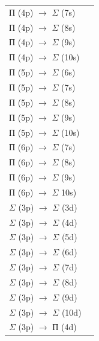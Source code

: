 \begin{flushleft}
\begin{supertabular}{|m{6.577cm}|m{6.801cm}|}
{П (4p) $\rightarrow $ $\Sigma $ (7s)} &
\raggedleft{}\\
{П (4p) $\rightarrow $ $\Sigma $ (8s)} &
\raggedleft{}\\
{П (4p) $\rightarrow $ $\Sigma $ (9s)} &
\raggedleft{}\\
{П (4p) $\rightarrow $ $\Sigma $ (10s)} &
\raggedleft{}\\\hline
{П (5p) $\rightarrow $ $\Sigma $ (6s)} &
\raggedleft{}\\
{П (5p) $\rightarrow $ $\Sigma $ (7s)} &
\raggedleft{}\\
{П (5p) $\rightarrow $ $\Sigma $ (8s)} &
\raggedleft{}\\
{П (5p) $\rightarrow $ $\Sigma $ (9s)} &
\raggedleft{}\\
{П (5p) $\rightarrow $ $\Sigma $ (10s)} &
\raggedleft{}\\\hline
{П (6p) $\rightarrow $ $\Sigma $ (7s)} &
\raggedleft{}\\
{П (6p) $\rightarrow $ $\Sigma $ (8s)} &
\raggedleft{}\\
{П (6p) $\rightarrow $ $\Sigma $ (9s)} &
\raggedleft{}\\
{П (6p) $\rightarrow $ $\Sigma $ 10s)} &
\raggedleft{}\\\hline
{$\Sigma $ (3p) $\rightarrow $ $\Sigma $ (3d)} &
\raggedleft{}\\
{$\Sigma $ (3p) $\rightarrow $ $\Sigma $ (4d)} &
\raggedleft{}\\
{$\Sigma $ (3p) $\rightarrow $ $\Sigma $ (5d)} &
\raggedleft{}\\
{$\Sigma $ (3p) $\rightarrow $ $\Sigma $ (6d)} &
\raggedleft{}\\
{$\Sigma $ (3p) $\rightarrow $ $\Sigma $ (7d)} &
\raggedleft{}\\
{$\Sigma $ (3p) $\rightarrow $ $\Sigma $ (8d)} &
\raggedleft{}\\
{$\Sigma $ (3p) $\rightarrow $ $\Sigma $ (9d)} &
\raggedleft{}\\
{$\Sigma $ (3p) $\rightarrow $ $\Sigma $ (10d)} &
\raggedleft{}\\\hline
{$\Sigma $ (3p) $\rightarrow $ П (4d)} &
\raggedleft{}\\

\end{supertabular}
\end{flushleft}
